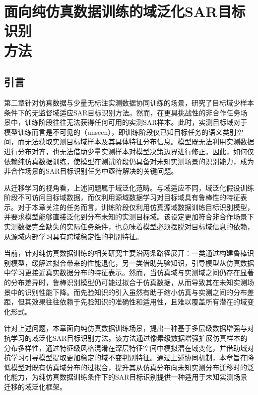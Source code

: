 \chapter[面向纯仿真数据训练的域泛化SAR目标识别方法]{面向纯仿真数据训练的域泛化SAR目标识别\\方法}


\section{引言}
第二章针对仿真数据与少量无标注实测数据协同训练的场景，研究了目标域少样本条件下的无监督域适应SAR目标识别方法。然而，在更具挑战性的非合作任务场景中，训练阶段往往无法获得任何可用的实测SAR样本。此时，实测目标域对于模型训练而言是不可见的（unseen），即训练阶段仅已知目标任务的语义类别空间，而无法获取实测目标域样本及其具体特征分布信息。模型既无法利用实测数据进行分布对齐，也无法借助少量实测样本对模型决策边界进行修正。因此，如何仅依赖纯仿真数据训练，使模型在测试阶段仍具备对未知实测场景的识别能力，成为非合作场景的SAR目标识别任务中亟待解决的关键问题。

从迁移学习的视角看，上述问题属于域泛化范畴。与域适应不同，域泛化假设训练阶段不可访问目标域数据，而仅利用源域数据学习对目标域具有鲁棒性的特征表示。对于本章关注的任务而言，训练阶段仅利用仿真源域数据训练目标识别模型，并要求模型能够直接泛化到分布未知的实测目标域。该设定更加符合非合作场景下实测数据完全缺失的实际任务条件，也意味着模型必须摆脱对目标域信息的依赖，从源域内部学习具有跨域稳定性的判别特征。

当前，针对纯仿真数据训练的相关研究主要沿两条路径展开：一类通过构建鲁棒识别模型，缓解过拟合带来的性能退化\cite{li2023hierarchical}，另一类借助先验知识，引导模型从仿真数据中学习更接近真实数据分布的特征表示\cite{inkawhich2021bridging}。然而，当仿真域与实测域之间仍存在显著的分布差异时，鲁棒识别模型仍可能过拟合于仿真数据，从而导致其在未知实测场景中的识别性能下降。而先验知识的引入虽然有助于缩小仿真与实测之间的分布差距，但其效果往往依赖于先验知识的准确性和适用性，且难以覆盖所有潜在的域变化形式。

针对上述问题，本章面向纯仿真数据训练场景，提出一种基于多层级数据增强与对抗学习的域泛化SAR目标识别方法。该方法通过像素级数据增强扩展仿真样本的分布多样性，通过特征级风格混淆在深层特征空间中模拟潜在域变化，并借助域对抗学习引导模型提取更加稳定的域不变判别特征。通过上述协同机制，本章旨在降低模型对既有仿真域分布的过拟合，提升其从仿真分布向未知实测分布迁移时的泛化能力，为纯仿真数据训练条件下的SAR目标识别提供一种适用于未知实测场景迁移的域泛化框架。




